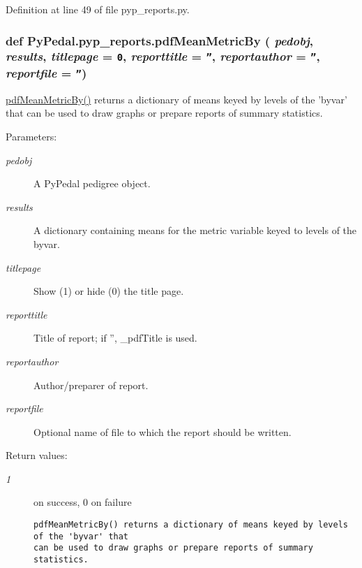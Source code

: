 Definition at line 49 of file pyp\_\-reports.py.\hypertarget{namespacePyPedal_1_1pyp__reports_ec86116b871dbe57b254cd10bd92fc8a}{
\subsubsection[pdfMeanMetricBy]{\setlength{\rightskip}{0pt plus 5cm}def Py\-Pedal.pyp\_\-reports.pdf\-Mean\-Metric\-By ( {\em pedobj},  {\em results},  {\em titlepage} = {\tt 0},  {\em reporttitle} = {\tt ''},  {\em reportauthor} = {\tt ''},  {\em reportfile} = {\tt ''})}}
\label{namespacePyPedal_1_1pyp__reports_ec86116b871dbe57b254cd10bd92fc8a}


\hyperlink{namespacePyPedal_1_1pyp__reports_ec86116b871dbe57b254cd10bd92fc8a}{pdf\-Mean\-Metric\-By()} returns a dictionary of means keyed by levels of the 'byvar' that can be used to draw graphs or prepare reports of summary statistics. 

\begin{Desc}
\item[Parameters:]
\begin{description}
\item[{\em pedobj}]A Py\-Pedal pedigree object. \item[{\em results}]A dictionary containing means for the metric variable keyed to levels of the byvar. \item[{\em titlepage}]Show (1) or hide (0) the title page. \item[{\em reporttitle}]Title of report; if '', \_\-pdf\-Title is used. \item[{\em reportauthor}]Author/preparer of report. \item[{\em reportfile}]Optional name of file to which the report should be written. \end{description}
\end{Desc}
\begin{Desc}
\item[Return values:]
\begin{description}
\item[{\em 1}]on success, 0 on failure

\footnotesize\begin{verbatim}pdfMeanMetricBy() returns a dictionary of means keyed by levels of the 'byvar' that
can be used to draw graphs or prepare reports of summary statistics.
\end{verbatim}
\normalsize
 \end{description}
\end{Desc}


